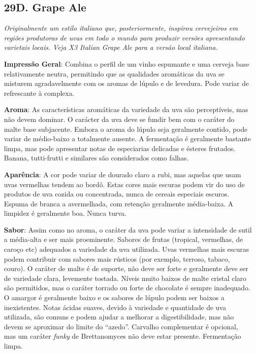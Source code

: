 \subsection*{29D. Grape Ale}
\textit{Originalmente um estilo italiano que, posteriormente, inspirou cervejeiros em regiões produtoras de uvas em todo o mundo para produzir versões apresentando varietais locais. Veja X3 Italian Grape Ale para a versão local italiana.}

\textbf{Impressão Geral}: Combina o perfil de um vinho espumante e uma cerveja base relativamente neutra, permitindo que as qualidades aromáticas da uva se misturem agradavelmente com os aromas de lúpulo e de levedura. Pode variar de refrescante à complexa.

\textbf{Aroma}: As características aromáticas da variedade da uva são perceptíveis, mas não devem dominar. O carácter da uva deve se fundir bem com o caráter do malte base subjacente. Embora o aroma do lúpulo seja geralmente contido, pode variar de médio-baixo a totalmente ausente. A fermentação é geralmente bastante limpa, mas pode apresentar notas de especiarias delicadas e ésteres frutados. Banana, tutti-frutti e similares são considerados como falhas.

\textbf{Aparência}: A cor pode variar de dourado claro a rubi, mas aquelas que usam uvas vermelhas tendem ao bordô. Estas cores mais escuras podem vir do uso de produtos de uva cozida ou concentrada, nunca de cereais especiais escuros. Espuma de branca a avermelhada, com retenção geralmente média-baixa. A limpidez é geralmente boa. Nunca turva.

\textbf{Sabor}: Assim como no aroma, o caráter da uva pode variar a intensidade de sutil a média-alta e ser mais proeminente. Sabores de frutas (tropical, vermelhas, de caroço etc) adequados a variedade da uva utilizada. Uvas vermelhas mais escuras podem contribuir com sabores mais rústicos (por exemplo, terroso, tabaco, couro). O caráter de malte é de suporte, não deve ser forte e geralmente deve ser de variedade clara, levemente tostada. Níveis muito baixos de malte cristal claro são permitidos, mas o caráter torrado ou forte de chocolate é sempre inadequado. O amargor é geralmente baixo e os sabores de lúpulo podem ser baixos a inexistentes. Notas ácidas suaves, devido à variedade e quantidade de uva utilizada, são comuns e podem ajudar a melhorar a digestibilidade, mas não devem se aproximar do limite do “azedo”. Carvalho complementar é opcional, mas um caráter \textit{funky} de Brettanomyces não deve estar presente. Fermentação limpa.

